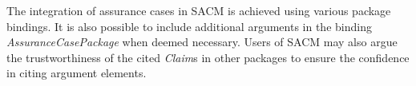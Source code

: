 The integration of assurance cases in SACM is achieved using various package bindings. 
It is also possible to include additional arguments in the binding \textit{AssuranceCasePackage} when deemed necessary. 
Users of SACM may also argue the trustworthiness of the cited \textit{Claim}s in other packages to ensure the confidence in citing argument elements. 